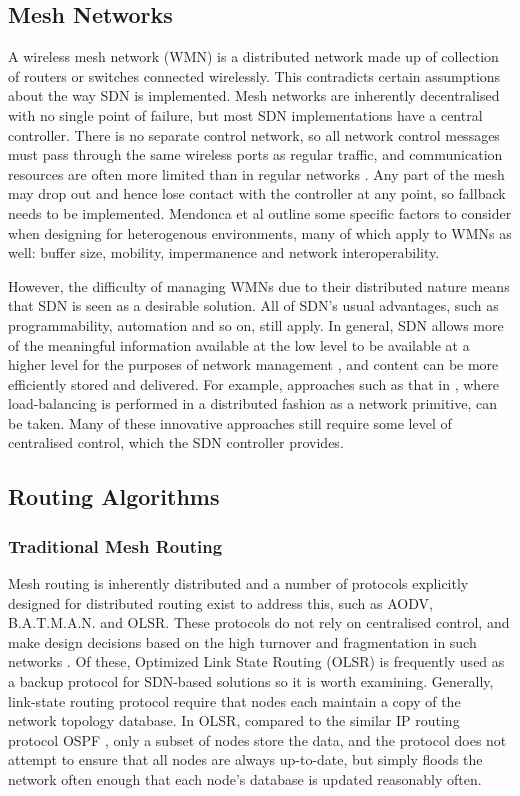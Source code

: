 \documentclass[pdftex,12pt,a4paper]{article}
\begin{document}
\newpage
\subsection{Mesh Networks}
A wireless mesh network (WMN) is a distributed network made up of collection of routers or switches connected wirelessly.
This contradicts certain assumptions about the way SDN is implemented. Mesh networks are inherently decentralised with no single point of failure, but most SDN implementations have a central controller. There is no separate control network, so all network control messages must pass through the same wireless ports as regular traffic, and communication resources are often more limited than in regular networks \cite{detti:wmsdn}. Any part of the mesh may drop out and hence lose contact with the controller at any point, so fallback needs to be implemented. Mendonca et al \cite{mendonca:hetero} outline some specific factors to consider when designing for heterogenous environments, many of which apply to WMNs as well: buffer size, mobility, impermanence and network interoperability.

However, the difficulty of managing WMNs due to their distributed nature means that SDN is seen as a desirable solution. All of SDN's usual advantages, such as programmability, automation and so on, still apply. In general, SDN allows more of the meaningful information available at the low level to be available at a higher level for the purposes of network management \cite{mendonca:hetero, dely:wmn}, and content can be more efficiently stored and delivered. For example, approaches such as that in \cite{handigol:asterix}, where load-balancing is performed in a distributed fashion as a network primitive, can be taken. Many of these innovative approaches still require some level of centralised control, which the SDN controller provides.

\newpage
\subsection{Routing Algorithms}
\subsubsection{Traditional Mesh Routing}
Mesh routing is inherently distributed and a number of protocols explicitly designed for distributed routing exist to address this, such as AODV, B.A.T.M.A.N. and OLSR. These protocols do not rely on centralised control, and make design decisions based on the high turnover and fragmentation in such networks \cite{dely:wmn, detti:wmsdn}. Of these, Optimized Link State Routing (OLSR) \cite{rfc3626} is frequently used as a backup protocol for SDN-based solutions so it is worth examining. Generally, link-state routing protocol require that nodes each maintain a copy of the network topology database. In OLSR, compared to the similar IP routing protocol OSPF \cite{rfc5340}, only a subset of nodes store the data, and the protocol does not attempt to ensure that all nodes are always up-to-date, but simply floods the network often enough that each node's database is updated reasonably often.
\end{document}
